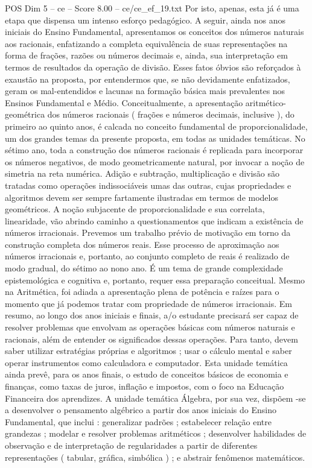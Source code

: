 \begin{textsample}{POS Dim 5 – ce – Score 8.00 – ce/ce\_ef\_19.txt}
Por isto, apenas, esta já é uma etapa que dispensa um intenso esforço pedagógico.
A seguir, ainda nos anos iniciais do Ensino Fundamental, apresentamos os conceitos dos números naturais aos racionais, enfatizando a completa equivalência de suas representações na forma de frações, razões ou números decimais e, ainda, sua interpretação em termos de resultados da operação de divisão.
Esses fatos óbvios são reforçados à exaustão na proposta, por entendermos que, se não devidamente enfatizados, geram os mal-entendidos e lacunas na formação básica mais prevalentes nos Ensinos Fundamental e Médio.
Conceitualmente, a apresentação aritmético-geométrica dos números racionais ( frações e números decimais, inclusive ), do primeiro ao quinto anos, é calcada no conceito fundamental de proporcionalidade, um dos grandes temas da presente proposta, em todas as unidades temáticas.
No sétimo ano, toda a construção dos números racionais é replicada para incorporar os números negativos, de modo geometricamente natural, por invocar a noção de simetria na reta numérica.
Adição e subtração, multiplicação e divisão são tratadas como operações indissociáveis umas das outras, cujas propriedades e algoritmos devem ser sempre fartamente ilustradas em termos de modelos geométricos.
A noção subjacente de proporcionalidade e sua correlata, linearidade, vão abrindo caminho a questionamentos que indicam a existência de números irracionais.
Prevemos um trabalho prévio de motivação em torno da construção completa dos números reais.
Esse processo de aproximação aos números irracionais e, portanto, ao conjunto completo de reais é realizado de modo gradual, do sétimo ao nono ano.
É um tema de grande complexidade epistemológica e cognitiva e, portanto, requer essa preparação conceitual.
Mesmo na Aritmética, foi adiada a apresentação plena de potência e raízes para o momento que já podemos tratar com propriedade de números irracionais.
Em resumo, ao longo dos anos iniciais e finais, a/o estudante precisará ser capaz de resolver problemas que envolvam as operações básicas com números naturais e racionais, além de entender os significados dessas operações.
Para tanto, devem saber utilizar estratégias próprias e algoritmos ; usar o cálculo mental e saber operar instrumentos como calculadora e computador.
Esta unidade temática ainda prevê, para os anos finais, o estudo de conceitos básicos de economia e finanças, como taxas de juros, inflação e impostos, com o foco na Educação Financeira dos aprendizes.
A unidade temática Álgebra, por sua vez, dispõem -se a desenvolver o pensamento algébrico a partir dos anos iniciais do Ensino Fundamental, que inclui : generalizar padrões ; estabelecer relação entre grandezas ; modelar e resolver problemas aritméticos ; desenvolver habilidades de observação e de interpretação de regularidades a partir de diferentes representações ( tabular, gráfica, simbólica ) ; e abstrair fenômenos matemáticos.

\end{textsample}
